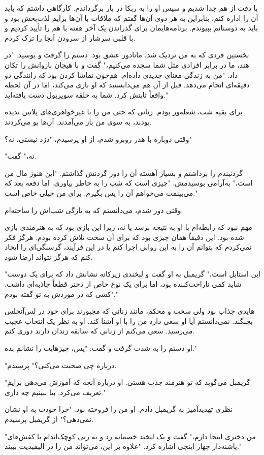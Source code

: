 با دقت از هم جدا شدیم و سپس او را به ربکا در بار برگرداندم. کارگاهی داشتم که باید آن را اداره کنم، بنابراین به هر دوی آن‌ها گفتم که ملاقات با آن‌ها برایم لذت‌بخش بود و باید به دوستانم بپیوندم. برنامه‌هایمان برای گذراندن یک آخر هفته با هم را تأیید کردیم و با قلبی سرشار از سرودن آنجا را ترک کردم.

نخستین فردی که به من نزدیک شد، ماتادور عشق بود. دستم را گرفت و بوسید. "در هند، ما در برابر افرادی مثل شما سجده می‌کنیم،" گفت و با هیجان بازوانش را تکان داد. "من به زندگی معنای جدیدی داده‌ام. هم‌چون تماشا کردن  بود که رانندگی دو دقیقه‌ای انجام می‌دهد. قبل از آن هم می‌دانستید که او بازی می‌کند، اما در آن لحظه واقعاً ثابتش کرد. شما به حلقه سوپربول دست یافته‌اید."

برای بقیه شب، شعله‌ور بودم. زنانی که حتی من را با غیرخواهری‌های پلاتین ندیده بودند، به سوی من باز می‌آمدند. آن‌ها بو می‌کردند.

وقتی دوباره با هدر روبرو شدم، از او پرسیدم، "دزد نیستی، نه؟"

"نه،" گفت.

گردنبندم را برداشتم و بسیار آهسته آن را دور گردنش گذاشتم. "این هنوز مال من است،" به‌آرامی بوسیدمش. "چیزی است که شب را به خاطر بیاوری. اما دفعه بعد که می‌بینمت می‌خواهم آن را پس بگیرم. برای من خیلی خاص است."

وقتی دور شدم، می‌دانستم که به تازگی شب‌اش را ساخته‌ام.

مهم نبود که رابطه‌ام با او به نتیجه برسد یا نه، زیرا این بازی بود که به هنرمندی بازی شده بود. این دقیقاً همان چیزی بود که برای آن سخت تلاش کرده بودم. هرگز فکر نمی‌کردم که بتوانم آن را به این روانی اجرا کنم یا در این فرآیند، گرسنگی‌ای را ایجاد کنم که هرگز نتواند ارضا شود.

"این استایل است،" گریمبل به او گفت و لبخندی زیرکانه نشانش داد که برای یک دوست شاید کمی ناراحت‌کننده بود، اما برای یک نوع خاص از دختر قطعاً جاذبه‌ای داشت. "کسی که در موردش به تو گفته بودم."

هایدی جذاب بود ولی سخت و محکم، مانند زنانی که مجبورند برای خود در لس‌آنجلس بجنگند. نمی‌دانستم آیا او سعی دارد من را با او آشنا کند. او به نظر یک انتخاب عجیب می‌رسید. سعی می‌کنم از زنانی که سابقه زندان دارند دوری کنم.

او دستم را به شدت گرفت و گفت: "پس، چیزهایت را نشانم بده."

"درباره چی صحبت می‌کنی؟" پرسیدم.

"گریمبل می‌گوید که تو هنرمند جذب هستی. او درباره آنچه که آموزش می‌دهی برایم تعریف می‌کرد. بیا ببینیم چه داری."

نظری تهدیدآمیز به گریمبل دادم. او من را فروخته بود. "چرا خودت به او نشان نمی‌دهی؟" از گریمبل پرسیدم.

"من دختری اینجا دارم،" گفت و یک لبخند خصمانه زد و به زنی کوچک‌اندام با کفش‌های پاشنه‌دار چهار اینچی اشاره کرد. "علاوه بر این، می‌تواند من را در الیمیدیت ببیند."